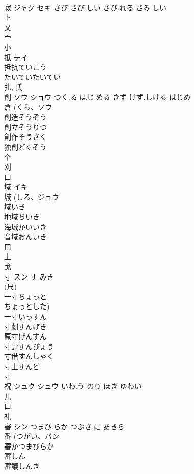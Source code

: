 \documentclass[8pt]{extreport}
\begin{document}
\begin{CJK}{UTF8}{min}
\\	寂	ジャク セキ	さび さび.しい さび.れる さみ.しい	
\\	卜 
\\	又 
\\	宀 
\\	小 
\\	抵	テイ		
\\	抵抗ていこう
\\	たいていたいてい
\\	扎, 氏 
\\	創	ソウ ショウ	つく.る はじ.める きず けず.しける はじめ	
\\	倉 (くら、ソウ 
\\	創造そうぞう
\\	創立そうりつ
\\	創作そうさく
\\	独創どくそう
\\	个 
\\	刈 
\\	口 
\\	域	イキ		
\\	城 (しろ、ジョウ 
\\	域いき
\\	地域ちいき
\\	海域かいいき
\\	音域おんいき
\\	口 
\\	土 
\\	戈 
\\	寸	スン	す みき	
\\	(尺) 
\\	一寸ちょっと
\\	ちょっとした) 
\\	一寸いっすん
\\	寸劇すんげき
\\	原寸げんすん
\\	寸評すんぴょう
\\	寸借すんしゃく
\\	寸土すんど
\\	寸 
\\	祝	シュク シュウ	いわ.う のり ほぎ ゆわい	
\\	儿 
\\	口 
\\	礼 
\\	審	シン	つまび.らか つぶさ.に あきら	
\\	番 (つがい、バン 
\\	審かつまびらか
\\	審しん
\\	審議しんぎ

\end{CJK}
\end{document}
